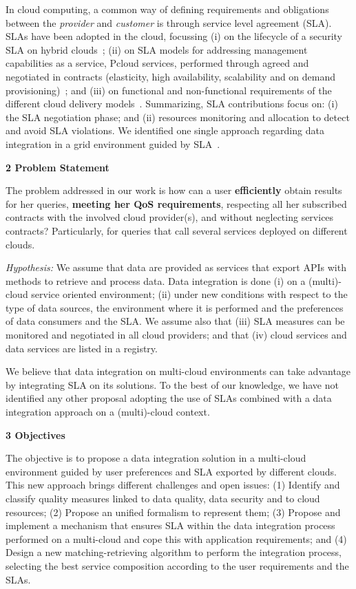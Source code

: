 \documentclass[11pt,a4paper,oneside]{report}
\begin{document}
In cloud computing, a common way of defining requirements and obligations between the \textit{provider} and \textit{customer} is through service level agreement (SLA). 
SLAs have been  adopted in the cloud, focussing (i) on the lifecycle of a security SLA on hybrid clouds~\cite{011}; (ii) on SLA models for addressing  management capabilities  as a service, Pcloud services, performed through agreed and negotiated in contracts (elasticity, high availability, scalability and on demand provisioning)~\cite{009}; and (iii) on functional and non-functional requirements of the different cloud delivery models~\cite{005}.
Summarizing, SLA contributions focus on: (i)   the SLA negotiation phase; and (ii)  resources monitoring and allocation  to detect and avoid SLA violations. We identified one single approach regarding data integration in a grid environment guided by SLA~\cite{Nie07}.

\begin{flushleft}
\textbf{2 Problem Statement}\\
\end{flushleft}
The problem addressed in our work is how can a user \textbf{efficiently} obtain results for her queries, \textbf{meeting her QoS requirements}, respecting all her subscribed contracts with the involved cloud provider(s), and without neglecting services contracts? 
Particularly, for queries that call several services deployed on different clouds.

\noindent
{\em Hypothesis:}  We assume that data are provided as services that export APIs with methods to retrieve  and process data. Data integration is done (i) on a (multi)-cloud service oriented environment;  (ii) under new conditions with respect to the type of data sources, the environment where it is performed and the preferences  of data consumers and the SLA. We assume also that (iii) SLA measures can be monitored and negotiated in all cloud providers; and that (iv) cloud services and data services are listed in a registry.

We believe that data integration on multi-cloud environments can take advantage by integrating SLA on its solutions. To the best of our knowledge, we have not identified any other proposal adopting the use of SLAs combined with a data integration approach on a (multi)-cloud context.

\begin{flushleft}
\textbf{3 Objectives}\\
\end{flushleft}
The  objective is to propose a data integration solution in a multi-cloud environment guided by user preferences and SLA exported by different clouds. This new approach brings different challenges and open issues: (1)  Identify and classify quality measures linked to data quality, data security and to cloud resources; (2) Propose an unified formalism to represent them; (3) Propose and implement a mechanism that ensures SLA within the data integration process  performed on a multi-cloud and cope this with application requirements; and (4) Design a new matching-retrieving algorithm to perform the integration process, selecting the best service composition according to the user requirements and the SLAs.
 
\end{document}
